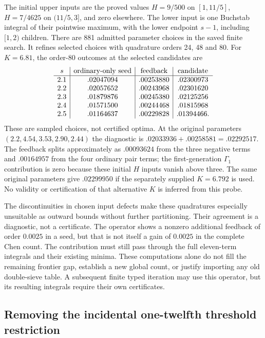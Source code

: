\documentclass[11pt]{article}
\begin{document}
The initial upper inputs are the proved values $H=9/500$ on
$[1,11/5]$, $H=7/4625$ on $(11/5,3]$, and zero elsewhere.
The lower input is one Buchstab integral of their pointwise maximum,
with the lower endpoint $s-1$, including $[1,2)$ children.
There are 881 admitted parameter choices in the saved finite search.
It refines selected choices with quadrature orders 24, 48 and 80.
For $K=6.81$, the order-80 outcomes at the selected candidates are
\[
\begin{array}{c|c|c|c}
s&\hbox{ordinary-only seed}&\hbox{feedback}&\hbox{candidate}\\\hline
2.1&.02047094&.00253880&.02300973\\
2.2&.02057652&.00243968&.02301620\\
2.3&.01879876&.00245380&.02125256\\
2.4&.01571500&.00244468&.01815968\\
2.5&.01164637&.00229828&.01394466.
\end{array}
\]
These are sampled choices, not certified optima.
At the original parameters $(2.2,4.54,3.53,2.90,2.44)$ the
diagnostic is $.02033936+.00258581=.02292517$.
The feedback splits approximately as $.00093624$ from the three
negative terms and $.00164957$ from the four ordinary pair terms;
the first-generation $\Gamma_1$ contribution is zero because these
initial $H$ inputs vanish above three.  The same original parameters
give $.02299950$ if the separately supplied $K=6.792$ is used.
No validity or certification of that alternative $K$ is inferred
from this probe.

The discontinuities in chosen input defects make these quadratures
especially unsuitable as outward bounds without further partitioning.
Their agreement is a diagnostic, not a certificate.  The operator
shows a nonzero additional feedback of order $0.0025$ in a seed,
but that is not itself a gain of $0.0025$ in the complete Chen count.
The contribution must still pass through the full eleven-term
integrals and their existing minima.  These computations alone do
not fill the remaining frontier gap, establish a new global count,
or justify importing any old double-sieve table.  A subsequent
finite typed iteration may use this operator, but its resulting
integrals require their own certificates.

\subsection{Removing the incidental one-twelfth threshold restriction}
\label{sec:free-threshold-fixed-cutoff-extension}
\end{document}
